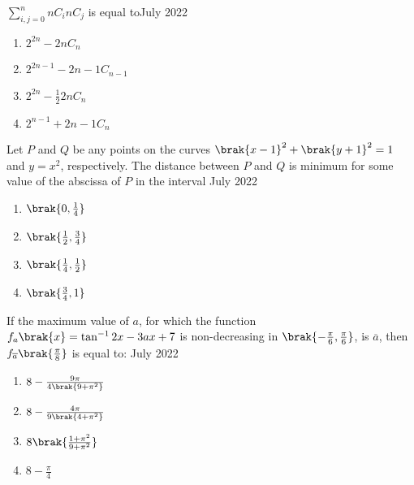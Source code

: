     \item $\sum_{i,j=0}^{n} {n}C_{i} {n}C_{j}$ is equal to\hfill{July 2022}
 
        \begin{enumerate}
        \item $2^{2n} - {2n}C_{n}$
        \item $2^{2n-1} - {2n-1}C_{n-1}$
        \item $2^{2n} - \frac{1}{2} {2n}C_{n}$
        \item $2^{n-1} + {2n-1}C_{n}$
        \end{enumerate}

    \item Let $P$ and $Q$ be any points on the curves $\brak{x - 1}^{2} + \brak{y + 1}^{2} = 1$ and $y = x^{2}$, respectively. The distance between $P$ and $Q$ is minimum for some value of the abscissa of $P$ in the interval \hfill{July 2022}

        \begin{multicols}{4}
        \begin{enumerate}
        \item $\brak{0, \frac{1}{4}}$
        \item $\brak{\frac{1}{2}, \frac{3}{4}}$
        \item $\brak{\frac{1}{4}, \frac{1}{2}}$
        \item $\brak{\frac{3}{4}, 1}$
        \end{enumerate}
        \end{multicols}

    \item If the maximum value of $a$, for which the function $f_{a} \brak{x} = \tan^{-1} 2x - 3ax + 7$ is non-decreasing in $\brak{-\frac{\pi}{6}, \frac{\pi}{6}}$, is $\overline{a}$, then $f_{\overline{a}} \brak{\frac{\pi}{8}}$ is equal to: \hfill{July 2022}

        \begin{multicols}{4}
        \begin{enumerate}
        \item $8 - \frac{9\pi}{4\brak{9 + \pi^{2}}}$
        \item $8 - \frac{4\pi}{9\brak{4 + \pi^{2}}}$
        \item $8 \brak{\frac{1 + \pi^{2}}{9 + \pi^{2}}}$
        \item $8 - \frac{\pi}{4}$
        \end{enumerate}
        \end{multicols}

